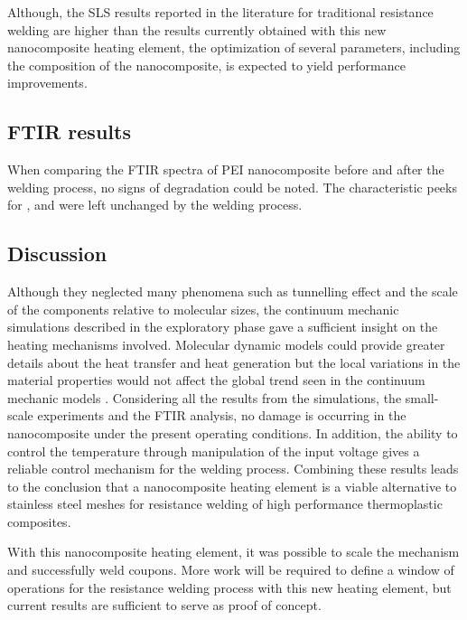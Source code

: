 \documentclass[11pt,review,times]{elsarticle}
\begin{document}
Although, the SLS results reported in the literature for traditional resistance welding are higher than the results currently obtained with this new nanocomposite heating element, the optimization of several parameters, including the composition of the nanocomposite, is expected to yield performance improvements. 

\subsection{FTIR results}

When comparing the FTIR spectra of PEI nanocomposite before and after the welding process, no signs of degradation could be noted. 
The characteristic peeks for ,  and  were left unchanged by the welding process. 

\subsection{Discussion}

Although they neglected many phenomena such as tunnelling effect and the scale of the components relative to molecular sizes, the continuum mechanic simulations described in the exploratory phase gave a sufficient insight on the heating mechanisms involved. 
Molecular dynamic models could provide greater details about the heat transfer and heat generation but the local variations in the material properties would not affect the global trend seen in the continuum mechanic models \cite{Rafiee2013}. 
Considering all the results from the simulations, the small-scale experiments and the FTIR analysis, no damage is occurring in the nanocomposite under the present operating conditions. 
In addition, the ability to control the temperature through manipulation of the input voltage gives a reliable control mechanism for the welding process. 
Combining these results leads to the conclusion that a nanocomposite heating element is a viable alternative to stainless steel meshes for resistance welding of high performance thermoplastic composites. 

With this nanocomposite heating element, it was possible to scale the mechanism and successfully weld coupons. 
More work will be required to define a window of operations for the resistance welding process with this new heating element, but current results are sufficient to serve as proof of concept. 

\FloatBarrier

\end{document}
